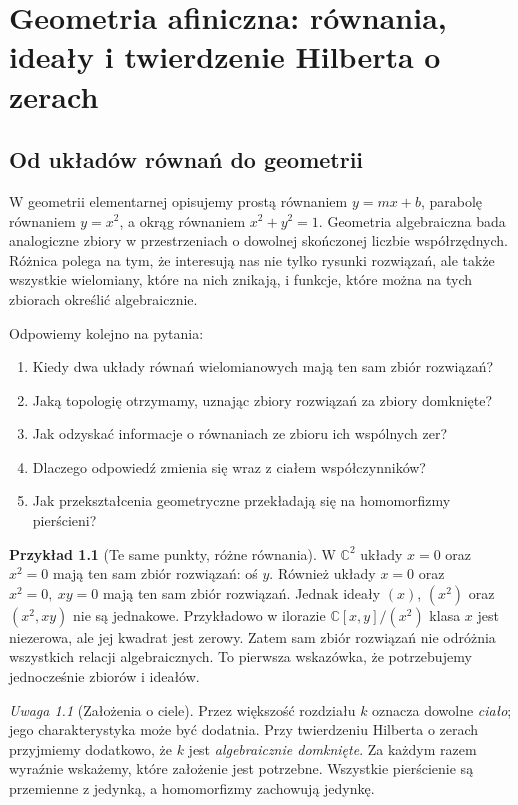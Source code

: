 \documentclass[11pt,a4paper,openany]{report}
\numberwithin{equation}{section}
\theoremstyle{plain}
\theoremstyle{definition}
\newtheorem{przyklad}[twierdzenie]{Przykład}
\theoremstyle{remark}
\newtheorem{uwaga}[twierdzenie]{Uwaga}
\newcommand{\C}{\mathbb C}
\begin{document}
\chapter{Geometria afiniczna: równania, ideały i twierdzenie Hilberta o zerach}
\label{ch:afiniczna}

\providecommand{\atlasref}[2]{#2}

\section{Od układów równań do geometrii}

W geometrii elementarnej opisujemy prostą równaniem $y=mx+b$, parabolę
równaniem $y=x^2$, a okrąg równaniem $x^2+y^2=1$. Geometria algebraiczna
bada analogiczne zbiory w przestrzeniach o dowolnej skończonej liczbie
współrzędnych. Różnica polega na tym, że interesują nas nie tylko
rysunki rozwiązań, ale także wszystkie wielomiany, które na nich znikają,
i funkcje, które można na tych zbiorach określić algebraicznie.

Odpowiemy kolejno na pytania:
\begin{enumerate}[label=\arabic*)]
\item Kiedy dwa układy równań wielomianowych mają ten sam zbiór rozwiązań?
\item Jaką topologię otrzymamy, uznając zbiory rozwiązań za zbiory domknięte?
\item Jak odzyskać informacje o równaniach ze zbioru ich wspólnych zer?
\item Dlaczego odpowiedź zmienia się wraz z ciałem współczynników?
\item Jak przekształcenia geometryczne przekładają się na homomorfizmy pierścieni?
\end{enumerate}

\begin{przyklad}[Te same punkty, różne równania]
W $\C^2$ układy $x=0$ oraz $x^2=0$ mają ten sam zbiór
rozwiązań: oś $y$. Również układy $x=0$ oraz $x^2=0,\ xy=0$
mają ten sam zbiór rozwiązań. Jednak ideały $(x)$, $(x^2)$ oraz
$(x^2,xy)$ nie są jednakowe. Przykładowo w ilorazie
$\C[x,y]/(x^2)$ klasa $x$ jest niezerowa, ale jej kwadrat jest zerowy.
Zatem sam zbiór rozwiązań nie odróżnia wszystkich relacji algebraicznych.
To pierwsza wskazówka, że potrzebujemy jednocześnie zbiorów i ideałów.
\end{przyklad}

\begin{uwaga}[Założenia o ciele]
Przez większość rozdziału $k$ oznacza dowolne \emph{ciało}; jego
charakterystyka może być dodatnia. Przy twierdzeniu Hilberta o zerach
przyjmiemy dodatkowo, że $k$ jest \emph{algebraicznie domknięte}.
Za każdym razem wyraźnie wskażemy, które założenie jest potrzebne.
Wszystkie pierścienie są przemienne z jedynką, a homomorfizmy zachowują jedynkę.
\end{uwaga}
\end{document}
